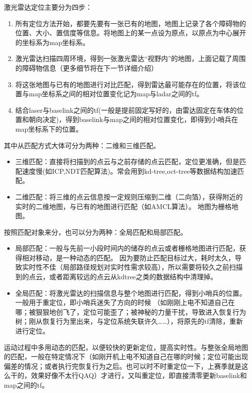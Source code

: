 激光雷达定位主要分为四步：
\begin{enumerate}
\item 所有定位方法开始，都要先要有一张已有的地图，地图上记录了各个障碍物的位置、大小、置信度等信息。将地图上的某一点设为原点，以原点为中心展开的坐标系为map坐标系。
\item 激光雷达扫描四周环境，得到一张激光雷达“视野内”的地图，上面记载了周围的障碍物信息（更多细节将在下一节详细介绍）
\item 将这张地图与已有的地图进行对比匹配，得到雷达最可能存在的位置，将该位置与map坐标系之间的相对位置变化记为map与ladar之间的tf。
\item 结合laser与baselink之间的tf(一般是提前固定写好的，由雷达固定在车体的位置和朝向决定)，得到baselink与map之间的相对位置变化，即得到小哨兵在map坐标系下的位置。
\end{enumerate}
其中从匹配方式大体可分为两种：二维和三维匹配。
\begin{itemize}

\item 三维匹配：直接将扫描到的点云与之前存储的点云匹配，定位更准确，但是匹配速度慢(如ICP,NDT匹配算法)。常会用到kd-tree,oct-tree等数据结构加速匹配。
\item 二维匹配：将三维的点云信息按一定规则压缩到二维（二向箔），获得附近的实时的二维地图，与已有的地图进行匹配（如AMCL算法）。
                地图为栅格地图。
\end{itemize}
按照匹配对象来分，也可以分为两种：全局匹配和局部匹配。
\begin{itemize}
        \item 局部匹配：一般与先前一小段时间内的储存的点云或者栅格地图进行匹配，获得相对移动，是一种动态的匹配。
        因为要防止匹配目标过大，耗时太久，导致实时性不佳（局部路径规划对实时性需求较高），所以需要将较久之前扫描到的点云，或者距离较远的点云从kdtree之类的数据结构中清理掉。
        \item 全局匹配：将激光雷达的扫描信息与整个地图进行匹配，得到小哨兵的位置。一般用于重定位，即小哨兵迷失了方向的时候
                （如刚刚上电不知道自己在哪；被狠狠地创飞了，定位可能歪了；被神秘的力量干扰，导致进入恢复行为树；刚从恢复行为里出来，与定位系统失联许久……），将原先的tf清除，重新进行定位。
\end{itemize}
运动过程中多用动态的匹配，以便较快的更新定位，提高实时性。与整张全局地图的匹配，一般在特定情况下（如刚开机上电不知道自己在哪的时候；定位可能出现偏差的情况；或者执行完恢复行为之后。也可以时不时重定位一下，上赛季就是这么干的，效果好像不太行QAQ）才进行，又叫重定位，即直接清零更新baselink和map之间的tf。
